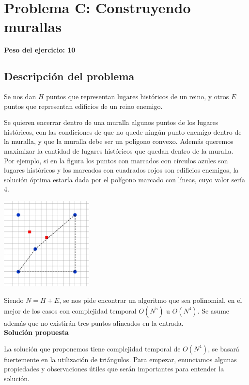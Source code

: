 \newpage{}
\section{Problema C: Construyendo murallas}
\textbf{Peso del ejercicio: 10}

\subsection{Descripción del problema}
Se nos dan $H$ puntos que representan lugares históricos de un reino, 
y otros $E$ puntos que representan edificios de un reino enemigo. 

Se quieren encerrar dentro de una muralla algunos puntos de los lugares históricos, 
con las condiciones de que no quede ningún punto enemigo dentro de la muralla, 
y que la muralla debe ser un polígono convexo. Además queremos maximizar la cantidad 
de lugares históricos que quedan dentro de la muralla. \\

Por ejemplo, si en la figura los puntos con marcados con círculos azules son lugares históricos 
y los marcados con cuadrados rojos son edificios enemigos, la solución óptima estaría dada por 
el polígono marcado con líneas, cuyo valor sería 4. 

\begin{center}
\includegraphics[width=0.35\textwidth]{ej3_1.jpg}
\end{center}

Siendo $N = H + E$, se nos pide encontrar un algoritmo que sea polinomial, en el mejor 
de los casos con complejidad temporal $O(N^5)$ u $O(N^4)$. Se asume además que no existirán 
tres puntos alineados en la entrada. \\

\textbf{Solución propuesta}

La solución que proponemos tiene complejidad temporal de $O(N^4)$, se basará fuertemente 
en la utilización de triángulos. Para empezar, enunciamos algunas propiedades y observaciones 
útiles que serán importantes para entender la solución. 

